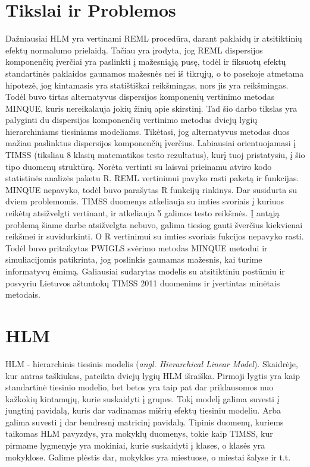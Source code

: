 \documentclass[12pt,a4paper]{article}
\begin{document}
\section*{Tikslai ir Problemos}
 Dažniausiai HLM yra vertinami REML procedūra, darant paklaidų ir atsitiktinių efektų normalumo prielaidą. Tačiau yra įrodyta, jog REML dispersijos komponenčių įverčiai yra paslinkti į mažesniąją pusę, todėl ir fiksuotų efektų standartinės paklaidos gaunamos mažesnės nei iš tikrųjų, o to pasekoje atmetama hipotezė, jog kintamasis yra statištiškai reikšmingas, nors jis yra reikšmingas. Todėl buvo tirtas alternatyvus dispersijos komponenių vertinimo metodas MINQUE, kuris nereikalauja jokių žinių apie skirstinį. Tad šio darbo tikslas yra palyginti du dispersijos komponenčių vertinimo metodus dviejų lygių hierarchiniams tiesiniams modeliams. Tikėtasi, jog alternatyvus metodas duos mažiau paslinktus dispersijos komponenčių įverčius. Labiausiai orientuojamasi į TIMSS (tiksliau 8 klasių matematikos testo rezultatus), kurį tuoj pristatysiu, į šio tipo duomenų struktūrą. Norėta vertinti su laisvai prieinamu atviro kodo statistinės analizės paketu R. REML vertinimui pavyko rasti paketą ir funkcijas. MINQUE nepavyko, todėl buvo parašytas R funkcijų rinkinys. Dar susidurta su dviem problemomis. TIMSS duomenys atkeliauja su imties svoriais į kuriuos reikėtų atsižvelgti vertinant, ir atkeliauja 5 galimos testo reikšmės. Į antąją problemą šiame darbe atsižvelgta nebuvo, galima tiesiog gauti šverčius kiekvienai reikšmei ir suvidurkinti. O R vertinimui su imties svoriais fukcijos nepavyko rasti. Todėl buvo pritaikytas PWIGLS svėrimo metodas MINQUE metodui ir simuliacijomis patikrinta, jog poslinkis gaunamas mažesnis, kai turime informatyvų ėmimą. Galiausiai sudarytas modelis su atsitiktiniu postūmiu ir posvyriu Lietuvos aštuntokų TIMSS 2011 duomenims ir įvertintas minėtais metodais.


\section*{HLM}
HLM - hierarchinis tiesinis modelis (\textit{angl. Hierarchical Linear Model}). Skaidrėje, kur antras taškiukas, pateikta dviejų lygių HLM išraiška. Pirmoji lygtis yra kaip standartinė tiesinio modelio, bet betos yra taip pat dar priklausomos nuo kažkokių kintamųjų, kurie suskaidyti į grupes. Tokį modelį galima suvesti į jungtinį pavidalą, kuris dar vadinamas mišrių efektų tiesiniu modeliu. Arba galima suvesti į dar bendresnį matricinį pavidalą. Tipinis duomenų, kuriems taikomas HLM pavyzdys, yra mokyklų duomenys, tokie kaip TIMSS, kur pirmame lygmenyje yra mokiniai, kurie suskaidyti į klases, o klasės yra mokyklose. Galime plėstis dar, mokyklos yra miestuose, o miestai šalyse ir t.t.
\end{document}

